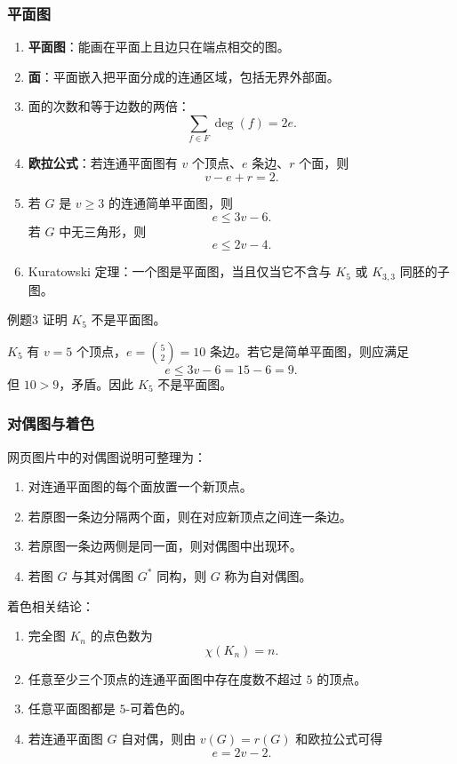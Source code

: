 \subsubsection{平面图}

\begin{enumerate}
	\item \textbf{平面图}：能画在平面上且边只在端点相交的图。
	\item \textbf{面}：平面嵌入把平面分成的连通区域，包括无界外部面。
	\item 面的次数和等于边数的两倍：
	\[
	\sum_{f\in F}\deg(f)=2e.
	\]
	\item \textbf{欧拉公式}：若连通平面图有 \(v\) 个顶点、\(e\) 条边、\(r\) 个面，则
	\[
	v-e+r=2.
	\]
	\item 若 \(G\) 是 \(v\ge3\) 的连通简单平面图，则
	\[
	e\le3v-6.
	\]
	若 \(G\) 中无三角形，则
	\[
	e\le2v-4.
	\]
	\item Kuratowski 定理：一个图是平面图，当且仅当它不含与 \(K_5\) 或 \(K_{3,3}\) 同胚的子图。
\end{enumerate}

\begin{question}{例题3}
	证明 \(K_5\) 不是平面图。
	
	\begin{solution}
	\(K_5\) 有 \(v=5\) 个顶点，\(e=\binom52=10\) 条边。若它是简单平面图，则应满足
	\[
	e\le3v-6=15-6=9.
	\]
	但 \(10>9\)，矛盾。因此 \(K_5\) 不是平面图。
	\end{solution}
\end{question}

\subsubsection{对偶图与着色}

网页图片中的对偶图说明可整理为：
\begin{enumerate}
	\item 对连通平面图的每个面放置一个新顶点。
	\item 若原图一条边分隔两个面，则在对应新顶点之间连一条边。
	\item 若原图一条边两侧是同一面，则对偶图中出现环。
	\item 若图 \(G\) 与其对偶图 \(G^*\) 同构，则 \(G\) 称为自对偶图。
\end{enumerate}

着色相关结论：
\begin{enumerate}
	\item 完全图 \(K_n\) 的点色数为
	\[
	\chi(K_n)=n.
	\]
	\item 任意至少三个顶点的连通平面图中存在度数不超过 \(5\) 的顶点。
	\item 任意平面图都是 \(5\)-可着色的。
	\item 若连通平面图 \(G\) 自对偶，则由 \(v(G)=r(G)\) 和欧拉公式可得
	\[
	e=2v-2.
	\]
\end{enumerate}

